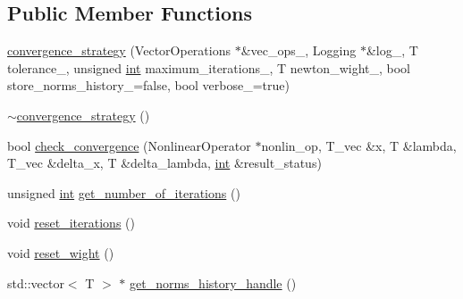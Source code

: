 \subsection*{Public Member Functions}
\begin{DoxyCompactItemize}
\item 
\hyperlink{classdeflation_1_1newton__method__extended_1_1convergence__strategy_a9ca9cf9f688586ed07f00395bae6e668}{convergence\-\_\-strategy} (Vector\-Operations $\ast$\&vec\-\_\-ops\-\_\-, Logging $\ast$\&log\-\_\-, T tolerance\-\_\-, unsigned \hyperlink{classint}{int} maximum\-\_\-iterations\-\_\-, T newton\-\_\-wight\-\_\-, bool store\-\_\-norms\-\_\-history\-\_\-=false, bool verbose\-\_\-=true)
\item 
\hyperlink{classdeflation_1_1newton__method__extended_1_1convergence__strategy_a34c8b595e91495861191123ef90d0d4b}{$\sim$convergence\-\_\-strategy} ()
\item 
bool \hyperlink{classdeflation_1_1newton__method__extended_1_1convergence__strategy_a537bfe541b97eb6810d9f72a951d44cc}{check\-\_\-convergence} (Nonlinear\-Operator $\ast$nonlin\-\_\-op, T\-\_\-vec \&x, T \&lambda, T\-\_\-vec \&delta\-\_\-x, T \&delta\-\_\-lambda, \hyperlink{classint}{int} \&result\-\_\-status)
\item 
unsigned \hyperlink{classint}{int} \hyperlink{classdeflation_1_1newton__method__extended_1_1convergence__strategy_a9d9ce3025cff7f1aec33e44da85f1526}{get\-\_\-number\-\_\-of\-\_\-iterations} ()
\item 
void \hyperlink{classdeflation_1_1newton__method__extended_1_1convergence__strategy_ac7a2306183d029d7c865a49d55e01425}{reset\-\_\-iterations} ()
\item 
void \hyperlink{classdeflation_1_1newton__method__extended_1_1convergence__strategy_a7dc80cfafdb7057cc10b5f05bb1e287a}{reset\-\_\-wight} ()
\item 
std\-::vector$<$ T $>$ $\ast$ \hyperlink{classdeflation_1_1newton__method__extended_1_1convergence__strategy_a325a124ea85d1ae522d3d1fe24c28b9c}{get\-\_\-norms\-\_\-history\-\_\-handle} ()
\end{DoxyCompactItemize}


